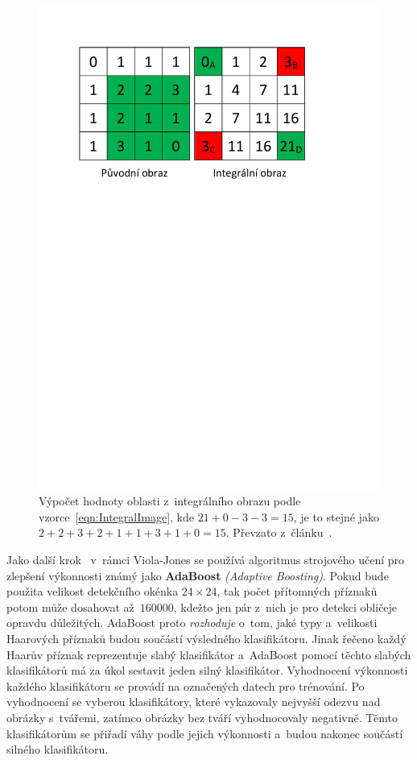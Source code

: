 \begin{figure}[hbt]
	\includegraphics[width=1.0\textwidth]{obrazky-figures/IntegralImageCalculation.pdf}
	\caption{Výpočet hodnoty oblasti z~integrálního obrazu podle vzorce~\ref{eqn:IntegralImage}, kde \newline $21 + 0 - 3 - 3 = 15$, je to stejné jako $2 + 2 + 3 + 2 + 1 + 1 + 3 + 1 + 0 = 15$. Převzato z~článku~\cite{website:FaceDetectionViolaJones}.}
	\label{img:IntegralImageCalculation}
\endminipage\hfill
\end{figure}

Jako další krok~\cite{website:FaceDetectionViolaJones} v~rámci Viola-Jones se používá algoritmus strojového učení pro zlepšení výkonnosti známý jako \textbf{AdaBoost} \emph{(Adaptive Boosting)}. Pokud bude použita velikost detekčního okénka $24 \times 24$, tak počet přítomných příznaků potom může dosahovat až~$160 000$, kdežto jen pár z~nich je pro detekci obličeje opravdu důležitých. AdaBoost proto \emph{rozhoduje} o~tom, jaké typy a~velikosti Haarových příznaků budou součástí výsledného klasifikátoru. Jinak řečeno každý Haarův příznak reprezentuje slabý klasifikátor a~AdaBoost pomocí těchto slabých klasifikátorů má za úkol sestavit jeden silný klasifikátor. Vyhodnocení výkonnosti každého klasifikátoru se provádí na označených datech pro trénování. Po vyhodnocení se vyberou klasifikátory, které vykazovaly nejvyšší odezvu nad obrázky s~tvářemi, zatímco obrázky bez tváří vyhodnocovaly negativně. Těmto klasifikátorům se přiřadí váhy podle jejich výkonnosti a~budou nakonec součástí silného klasifikátoru.

